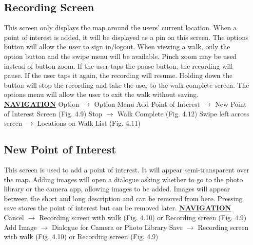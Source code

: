\documentclass[12pt]{article}
\begin{document}
\subsection{Recording Screen}
\par{This screen only displays the map around the users’ current location. When a point of
interest is added, it will be displayed as a pin on this screen. The options button will allow
the user to sign in/logout. When viewing a walk, only the option button and the swipe menu
will be available. Pinch zoom may be used instead of button zoom. If the user taps the pause
button, the recording will pause. If the user taps it again, the recording will resume. Holding
down the button will stop the recording and take the user to the walk complete screen. The
options menu will allow the user to exit the walk without saving.}\newline
\textbf{\underline{NAVIGATION}} \newline
Option $\rightarrow$ Option Menu \newline
Add Point of Interest $\rightarrow$ New Point of Interest Screen (Fig. 4.9) \newline
Stop $\rightarrow$ Walk Complete (Fig. 4.12) \newline
Swipe left across screen $\rightarrow$ Locations on Walk List (Fig. 4.11) \newline
\subsection{New Point of Interest}
\par{This screen is used to add a point of interest. It will appear semi-transparent over the map.
Adding images will open a dialogue asking whether to go to the photo library or the camera
app, allowing images to be added. Images will appear between the short and long
description and can be removed from here. Pressing save stores the point of interest but can
be removed later.} \newline
\textbf{\underline{NAVIGATION}} \newline
Cancel $\rightarrow$ Recording screen with walk (Fig. 4.10) or Recording screen (Fig. 4.9) \newline
Add Image $\rightarrow$ Dialogue for Camera or Photo Library \newline
Save $\rightarrow$ Recording screen with walk (Fig. 4.10) or Recording screen (Fig. 4.9) \newline
\end{document}
